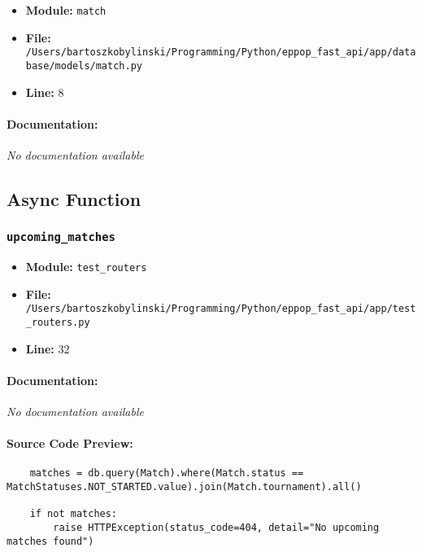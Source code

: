 \documentclass[11pt,a4paper]{article}
\begin{document}
\begin{itemize}
    \item \textbf{Module:} \texttt{match}
    \item \textbf{File:} \texttt{/Users/bartoszkobylinski/Programming/Python/eppop\_fast\_api/app/database/models/match.py}
    \item \textbf{Line:} 8
\end{itemize}

\paragraph{Documentation:} \textit{No documentation available}


\vspace{1em}
\subsection{Async Function}

\subsubsection{\texttt{upcoming\_matches}}

\begin{itemize}
    \item \textbf{Module:} \texttt{test\_routers}
    \item \textbf{File:} \texttt{/Users/bartoszkobylinski/Programming/Python/eppop\_fast\_api/app/test\_routers.py}
    \item \textbf{Line:} 32
\end{itemize}

\paragraph{Documentation:} \textit{No documentation available}

\paragraph{Source Code Preview:}
\begin{verbatim}
    matches = db.query(Match).where(Match.status == MatchStatuses.NOT_STARTED.value).join(Match.tournament).all()

    if not matches:
        raise HTTPException(status_code=404, detail="No upcoming matches found")

\end{verbatim}
\end{document}
